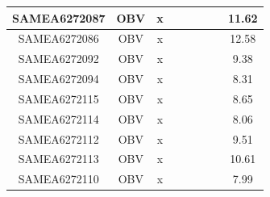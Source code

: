 \documentclass[../main.tex]{subfiles}
\begin{document}
\begin{flushleft}
\begin{footnotesize}
\begin{longtable}{|c|c|c|c|c|c|c|}
    \hline
    SAMEA6272087  & OBV   & x                                                            & ~          & ~                                                                           & ~                                                                 & 11.62     \\ 
    \hline
    SAMEA6272086  & OBV   & x                                                            & ~          & ~                                                                           & ~                                                                 & 12.58     \\ 
    \hline
    SAMEA6272092  & OBV   & x                                                            & ~          & ~                                                                           & ~                                                                 & 9.38      \\ 
    \hline
    SAMEA6272094  & OBV   & x                                                            & ~          & ~                                                                           & ~                                                                 & 8.31      \\ 
    \hline
    SAMEA6272115  & OBV   & x                                                            & ~          & ~                                                                           & ~                                                                 & 8.65      \\ 
    \hline
    SAMEA6272114  & OBV   & x                                                            & ~          & ~                                                                           & ~                                                                 & 8.06      \\ 
    \hline
    SAMEA6272112  & OBV   & x                                                            & ~          & ~                                                                           & ~                                                                 & 9.51      \\ 
    \hline
    SAMEA6272113  & OBV   & x                                                            & ~          & ~                                                                           & ~                                                                 & 10.61     \\ 
    \hline
    SAMEA6272110  & OBV   & x                                                            & ~          & ~                                                                           & ~                                                                 & 7.99      \\ 

\end{longtable}
\end{footnotesize}
\end{flushleft}
\end{document}
